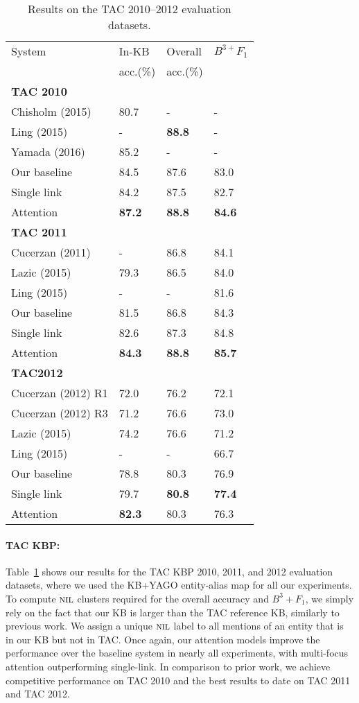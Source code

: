 \begin{table}[t!]
\centering
\begin{tabular}{l|l|l|l}
 System & In-KB & Overall & {\small ${B^{3+}F_1}$} \\ 
 & acc.(\%) & acc.(\%) & \\
\hline
\hline
{\bf TAC 2010} \\
\hline
Chisholm (2015) & 80.7& - & - \\
Ling (2015) & - & {\bf 88.8} & - \\
Yamada (2016)&  85.2 & - & - \\
  Our baseline & 84.5 & 87.6 & 83.0 \\
 Single link & 84.2 & 87.5 & 82.7\\
 Attention & {\bf 87.2} & {\bf 88.8} & {\bf 84.6} \\
\hline \hline
{\bf TAC 2011} \\
\hline
Cucerzan (2011) & - & 86.8 &  84.1 \\
Lazic (2015) & 79.3 & 86.5 & 84.0 \\
Ling (2015) &- & - & 81.6 \\
Our baseline & 81.5 & 86.8 & 84.3 \\
Single link & 82.6 & 87.3 & 84.8 \\
 Attention & {\bf 84.3} & {\bf 88.8} & {\bf 85.7} \\
\hline
\hline
{\bf TAC2012}\\
\hline
Cucerzan (2012) R1 & 72.0 & 76.2 & 72.1  \\
Cucerzan (2012) R3 & 71.2 & 76.6 & 73.0 \\
Lazic (2015) & {74.2} & {76.6} & 71.2 \\
Ling (2015) & - & - & 66.7 \\
Our baseline &78.8 & 80.3 & 76.9\\
 Single link & 79.7 & {\bf 80.8} & {\bf 77.4}  \\
 Attention &{\bf 82.3} & 80.3 & 76.3 \\ \hline
\end{tabular}
\caption{Results on the TAC 2010--2012 evaluation datasets. \label{table:tac_results} }
\end{table}

\paragraph*{TAC KBP:}
Table~\ref{table:tac_results} shows our results for the TAC KBP 2010, 2011, and 2012
evaluation datasets, where we used the KB+YAGO entity-alias map for all our experiments. 
To compute $\mbox{\textsc{nil}}$ clusters required for the overall accuracy
and $B^3+F_1$, we simply rely on the fact that our KB is larger than the TAC
reference KB, similarly to previous work. We assign a unique $\mbox{\textsc{nil}}$ label to
all mentions of an entity that is in our KB but not in TAC. 
Once again, our attention models improve the performance over the baseline
system in nearly all experiments, with multi-focus attention outperforming single-link. In comparison to
prior work, we achieve competitive performance on TAC 2010 and the best
results to date on TAC 2011 and TAC 2012.

